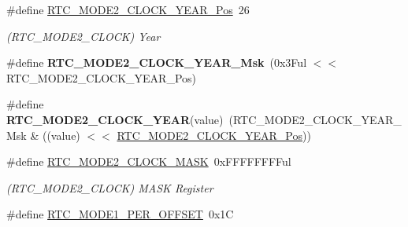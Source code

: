 \begin{DoxyCompactItemize}
\item 
\hypertarget{group___s_a_m_l21___r_t_c_gaa62b31439552125c2d3a06ef11d219f3}{}\#define \hyperlink{group___s_a_m_l21___r_t_c_gaa62b31439552125c2d3a06ef11d219f3}{R\+T\+C\+\_\+\+M\+O\+D\+E2\+\_\+\+C\+L\+O\+C\+K\+\_\+\+Y\+E\+A\+R\+\_\+\+Pos}~26\label{group___s_a_m_l21___r_t_c_gaa62b31439552125c2d3a06ef11d219f3}

\begin{DoxyCompactList}\small\item\em (R\+T\+C\+\_\+\+M\+O\+D\+E2\+\_\+\+C\+L\+O\+C\+K) Year \end{DoxyCompactList}\item 
\hypertarget{group___s_a_m_l21___r_t_c_gaebc4496f803e55114f019b6d90eac249}{}\#define {\bfseries R\+T\+C\+\_\+\+M\+O\+D\+E2\+\_\+\+C\+L\+O\+C\+K\+\_\+\+Y\+E\+A\+R\+\_\+\+Msk}~(0x3\+Ful $<$$<$ R\+T\+C\+\_\+\+M\+O\+D\+E2\+\_\+\+C\+L\+O\+C\+K\+\_\+\+Y\+E\+A\+R\+\_\+\+Pos)\label{group___s_a_m_l21___r_t_c_gaebc4496f803e55114f019b6d90eac249}

\item 
\hypertarget{group___s_a_m_l21___r_t_c_gadfdf7358dc5c7175601c2e35aa6d5cbd}{}\#define {\bfseries R\+T\+C\+\_\+\+M\+O\+D\+E2\+\_\+\+C\+L\+O\+C\+K\+\_\+\+Y\+E\+A\+R}(value)~(R\+T\+C\+\_\+\+M\+O\+D\+E2\+\_\+\+C\+L\+O\+C\+K\+\_\+\+Y\+E\+A\+R\+\_\+\+Msk \& ((value) $<$$<$ \hyperlink{group___s_a_m_l21___r_t_c_gaa62b31439552125c2d3a06ef11d219f3}{R\+T\+C\+\_\+\+M\+O\+D\+E2\+\_\+\+C\+L\+O\+C\+K\+\_\+\+Y\+E\+A\+R\+\_\+\+Pos}))\label{group___s_a_m_l21___r_t_c_gadfdf7358dc5c7175601c2e35aa6d5cbd}

\item 
\hypertarget{group___s_a_m_l21___r_t_c_gaed1aedee8791deb669b87cdc45669809}{}\#define \hyperlink{group___s_a_m_l21___r_t_c_gaed1aedee8791deb669b87cdc45669809}{R\+T\+C\+\_\+\+M\+O\+D\+E2\+\_\+\+C\+L\+O\+C\+K\+\_\+\+M\+A\+S\+K}~0x\+F\+F\+F\+F\+F\+F\+F\+Ful\label{group___s_a_m_l21___r_t_c_gaed1aedee8791deb669b87cdc45669809}

\begin{DoxyCompactList}\small\item\em (R\+T\+C\+\_\+\+M\+O\+D\+E2\+\_\+\+C\+L\+O\+C\+K) M\+A\+S\+K Register \end{DoxyCompactList}\item 
\hypertarget{group___s_a_m_l21___r_t_c_gae19b86968346ad8b2348b43fb6a95da4}{}\#define \hyperlink{group___s_a_m_l21___r_t_c_gae19b86968346ad8b2348b43fb6a95da4}{R\+T\+C\+\_\+\+M\+O\+D\+E1\+\_\+\+P\+E\+R\+\_\+\+O\+F\+F\+S\+E\+T}~0x1\+C\label{group___s_a_m_l21___r_t_c_gae19b86968346ad8b2348b43fb6a95da4}


\end{DoxyCompactItemize}
